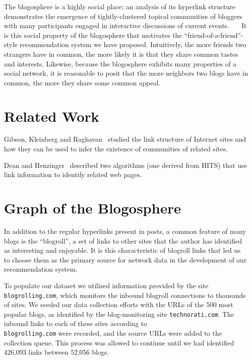 \documentclass{sig-alternate}
\begin{document}
%
The blogosphere is a highly social place; an analysis of its
hyperlink structure demonstrates the emergence of tightly-clustered
topical communities of bloggers with many participants engaged in
interactive discussions of current events.~\cite{adamic}~\cite{convBlog}~\cite{commBlog} It is this social property
of the blogosphere that motivates the
``friend-of-a-friend''-style recommendation system we
have proposed. Intuitively, the more friends two strangers have in
common, the more likely it is that they share common tastes and
interests.  Likewise, because the blogosphere exhibits many properties
of a social network, it is reasonable to posit that the more neighbors
two blogs have in common, the more they share some common appeal.

\section{Related Work}

Gibson, Kleinberg and Raghavan~\cite{gibson1998iwc} studied the link
structure of Internet sites and how they can be used to infer the
existence of communities of related sites.

Dean and Henzinger~\cite{dean1999frp} described two algorithms (one
derived from HITS) that use link information to identify related web
pages.

\section{Graph of the Blogosphere}
In addition to the regular hyperlinks present in posts, a common
feature of many blogs is the ``blogroll'', a set of
links to other sites that the author has identified as interesting and
enjoyable.  It is this characteristic of blogroll links
that led us to choose them as the primary source for network data in
the development of our recommendation system.

To populate our dataset we utilized information provided by the site
\texttt{blogrolling.com}, which monitors the inbound blogroll
connections to thousands of sites.  We seeded our data collection
efforts with the URLs of the 500 most popular blogs, as identified by
the blog-monitoring site  \texttt{technorati.com}.  The inbound links to each of
these sites according to \\ \texttt{blogrolling.com} were recorded, and the source
URLs were added to the collection queue.  This process was allowed to
continue until we had identified 426,093 links between 52,056 blogs.
\end{document}
